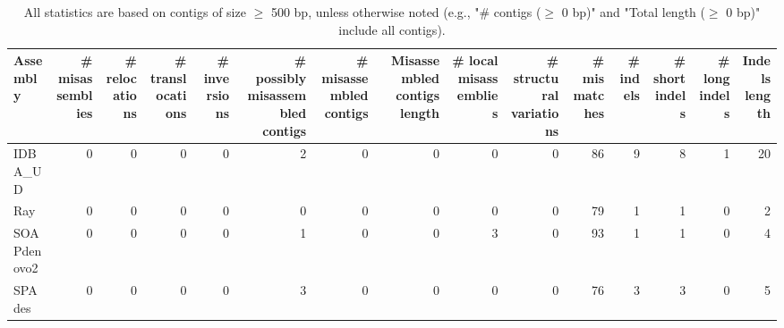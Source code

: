 \documentclass[12pt,a4paper]{article}
\begin{document}
\begin{table}[ht]
\begin{center}
\caption{All statistics are based on contigs of size $\geq$ 500 bp, unless otherwise noted (e.g., "\# contigs ($\geq$ 0 bp)" and "Total length ($\geq$ 0 bp)" include all contigs).}
\begin{tabular}{|l*{14}{|r}|}
\hline
Assembly & \# misassemblies &     \# relocations &     \# translocations &     \# inversions & \# possibly misassembled contigs & \# misassembled contigs & Misassembled contigs length & \# local misassemblies & \# structural variations & \# mismatches & \# indels &     \# short indels &     \# long indels & Indels length \\ \hline
IDBA\_UD & 0 & 0 & 0 & 0 & 2 & 0 & 0 & 0 & 0 & 86 & 9 & 8 & 1 & 20 \\ \hline
Ray & 0 & 0 & 0 & 0 & 0 & 0 & 0 & 0 & 0 & 79 & 1 & 1 & 0 & 2 \\ \hline
SOAPdenovo2 & 0 & 0 & 0 & 0 & 1 & 0 & 0 & 3 & 0 & 93 & 1 & 1 & 0 & 4 \\ \hline
SPAdes & 0 & 0 & 0 & 0 & 3 & 0 & 0 & 0 & 0 & 76 & 3 & 3 & 0 & 5 \\ \hline
\end{tabular}
\end{center}
\end{table}
\end{document}
